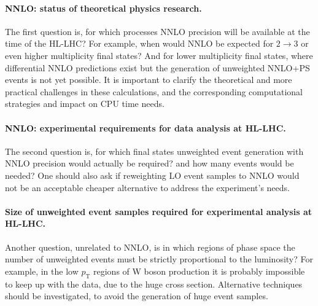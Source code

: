 \paragraph{NNLO: status of theoretical physics research.} The first question is,
for which processes NNLO precision will be available at the time of the
HL-LHC? For example, when would NNLO be expected for $2 \rightarrow 3$ or
even higher multiplicity final states? And for lower multiplicity final
states, where differential NNLO predictions exist but the generation of
unweighted NNLO+PS events is not yet possible. It is important to
clarify the theoretical and more practical challenges in these
calculations, and the corresponding computational strategies and impact
on CPU time needs.

\paragraph{NNLO: experimental requirements for data analysis at HL-LHC.} The
second question is, for which final states unweighted event generation
with NNLO precision would actually be required? and how many events
would be needed? One should also ask if reweighting LO event samples to
NNLO would not be an acceptable cheaper alternative to address the
experiment's needs.

\paragraph{Size of unweighted event samples required for experimental analysis
at HL-LHC.} Another question, unrelated to NNLO, is in which regions of
phase space the number of unweighted events must be strictly
proportional to the luminosity? For example, in the low $p_\text{T}$ regions of W
boson production it is probably impossible to keep up with the data, due
to the huge cross section. Alternative techniques should be
investigated, to avoid the generation of huge event samples.

